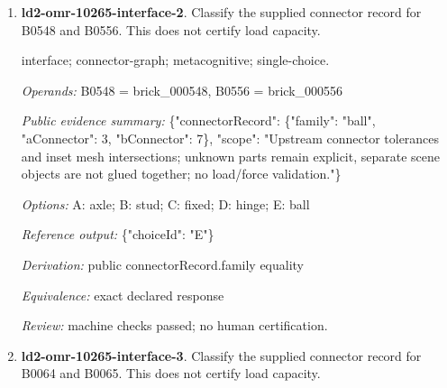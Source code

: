 \begin{enumerate}
\par{\small interface; connector-graph; metacognitive; single-choice.\par\textit{Operands:} B0010 = brick\_000010, B0013 = brick\_000013\par\textit{Public evidence summary:} \{"connectorRecord": \{"family": "axle", "aConnector": 14, "bConnector": 1\}, "scope": "Upstream connector tolerances and inset mesh intersections; unknown parts remain explicit, separate scene objects are not glued together; no load/force validation."\}\par\textit{Options:} A: hinge; B: stud; C: axle; D: ball; E: fixed\par\textit{Reference output:} \{"choiceId": "C"\}\par\textit{Derivation:} public connectorRecord.family equality\par\textit{Equivalence:} exact declared response\par\textit{Review:} pending required human review.}
\item \textbf{ld2-omr-10265-interface-2}. Classify the supplied connector record for B0548 and B0556. This does not certify load capacity.
\par{\small interface; connector-graph; metacognitive; single-choice.\par\textit{Operands:} B0548 = brick\_000548, B0556 = brick\_000556\par\textit{Public evidence summary:} \{"connectorRecord": \{"family": "ball", "aConnector": 3, "bConnector": 7\}, "scope": "Upstream connector tolerances and inset mesh intersections; unknown parts remain explicit, separate scene objects are not glued together; no load/force validation."\}\par\textit{Options:} A: axle; B: stud; C: fixed; D: hinge; E: ball\par\textit{Reference output:} \{"choiceId": "E"\}\par\textit{Derivation:} public connectorRecord.family equality\par\textit{Equivalence:} exact declared response\par\textit{Review:} machine checks passed; no human certification.}
\item \textbf{ld2-omr-10265-interface-3}. Classify the supplied connector record for B0064 and B0065. This does not certify load capacity.

\end{enumerate}
